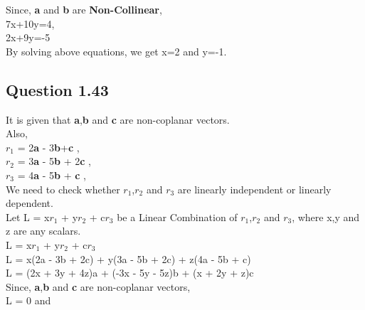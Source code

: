 \documentclass{article}
\begin{document}
    Since, \textbf{a} and \textbf{b} are \textbf{Non-Collinear},\\
    
    7x+10y=4,\\
    
    2x+9y=-5\\
    
    By solving above equations, we get x=2 and y=-1.
    
    \subsection{Question 1.43}
    
    It is given that \textbf{a},\textbf{b} and \textbf{c} are non-coplanar vectors.\\
    
    Also,\\
    
    \textbf{$r_{1}$} = 2\textbf{a} - 3\textbf{b}+\textbf{c} ,\\
    
    \textbf{$r_{2}$} = 3\textbf{a} - 5\textbf{b} + 2\textbf{c} ,\\
    
    \textbf{$r_{3}$} = 4\textbf{a} - 5\textbf{b} + \textbf{c} ,\\
    
    We need to check whether \textbf{$r_{1}$},\textbf{$r_{2}$} and \textbf{$r_{3}$} are linearly independent or linearly dependent.\\
    
    Let L = x\textbf{$r_{1}$} + y\textbf{$r_{2}$} + c\textbf{$r_{3}$} be a Linear Combination of \textbf{$r_{1}$},\textbf{$r_{2}$} and \textbf{$r_{3}$}, where x,y and z are any scalars.\\
    
    L = x\textbf{$r_{1}$} + y\textbf{$r_{2}$} + c\textbf{$r_{3}$}\\
    
    L = x(2a - 3b + 2c) + y(3a - 5b + 2c) + z(4a - 5b + c) \\
    
    L = (2x + 3y + 4z)a + (-3x - 5y - 5z)b + (x + 2y + z)c \\
    
    Since, \textbf{a},\textbf{b} and \textbf{c} are non-coplanar vectors, \\
    
    L = 0 and \\
    
\end{document}
